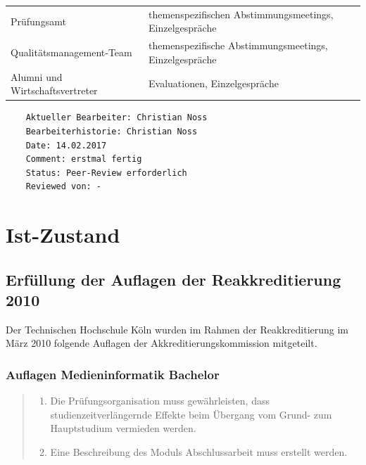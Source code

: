 \begin{longtable}[]{@{}ll@{}}
\begin{minipage}[t]{0.5\columnwidth}
Prüfungsamt\strut
\end{minipage} & \begin{minipage}[t]{0.5\columnwidth}\raggedright\strut
themenspezifischen Abstimmungsmeetings, Einzelgespräche\strut
\end{minipage}\tabularnewline
\begin{minipage}[t]{0.5\columnwidth}\raggedright\strut
Qualitätsmanagement-Team\strut
\end{minipage} & \begin{minipage}[t]{0.5\columnwidth}\raggedright\strut
themenspezifische Abstimmungsmeetings, Einzelgespräche\strut
\end{minipage}\tabularnewline
\begin{minipage}[t]{0.5\columnwidth}\raggedright\strut
Alumni und Wirtschaftsvertreter\strut
\end{minipage} & \begin{minipage}[t]{0.5\columnwidth}\raggedright\strut
Evaluationen, Einzelgespräche\strut
\end{minipage}\tabularnewline
\bottomrule
\end{longtable}

\begin{verbatim}
    Aktueller Bearbeiter: Christian Noss
    Bearbeiterhistorie: Christian Noss
    Date: 14.02.2017
    Comment: erstmal fertig
    Status: Peer-Review erforderlich
    Reviewed von: -
\end{verbatim}

\chapter{Ist-Zustand}\label{ist-zustand}

\section{Erfüllung der Auflagen der Reakkreditierung
2010}\label{erfuxfcllung-der-auflagen-der-reakkreditierung-2010}

Der Technischen Hochschule Köln wurden im Rahmen der Reakkreditierung im
März 2010 folgende Auflagen der Akkreditierungskommission mitgeteilt.

\subsection{Auflagen Medieninformatik
Bachelor}\label{auflagen-medieninformatik-bachelor}

\begin{quote}
\begin{enumerate}
\def\labelenumi{\arabic{enumi}.}
\tightlist
\item
  Die Prüfungsorganisation muss gewährleisten, dass
  studienzeitverlängernde Effekte beim Übergang vom Grund- zum
  Hauptstudium vermieden werden.
\item
  Eine Beschreibung des Moduls Abschlussarbeit muss erstellt werden.
\end{enumerate}
\end{quote}

